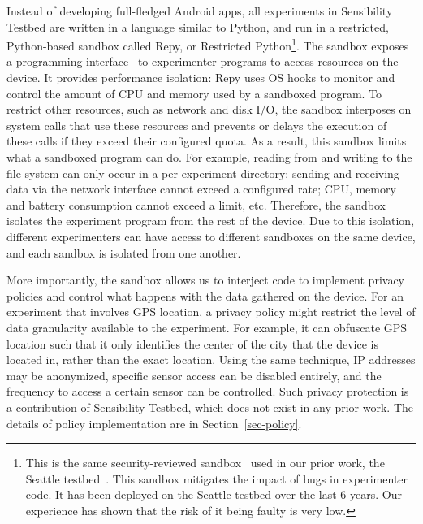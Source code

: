 Instead of developing full-fledged Android apps, all 
experiments in Sensibility Testbed are written in a language
similar to Python, and run in a restricted, Python-based
sandbox called Repy, or Restricted Python\footnote{This is the 
same security-reviewed sandbox~\cite{cappos2010retaining} used in
our prior work, the Seattle testbed~\cite{seattle}. This sandbox
mitigates the impact of bugs in experimenter code. It
has been deployed on the Seattle testbed over the last 6 years.
Our experience has shown that the risk of it being faulty is
very low.}. The sandbox exposes a programming 
interface~\cite{repyv2} to experimenter programs to access 
resources on the device. It provides performance isolation: 
Repy uses OS hooks to monitor and control the amount of 
CPU and memory used by a sandboxed program. To restrict 
other resources, such as network and disk I/O, the sandbox 
interposes on system calls that use these resources and 
prevents or delays the execution of these calls if they exceed 
their configured quota. As a result, this sandbox limits 
what a sandboxed program can do. For example, reading from and writing to the file system can
only occur in a per-experiment directory; sending and receiving
data via the network interface cannot exceed a configured rate;
CPU, memory and battery consumption cannot exceed a limit, etc.
Therefore, the sandbox isolates the experiment program from 
the rest of the device. Due to this isolation, different experimenters
can have access to different sandboxes on the same device,
and each sandbox is isolated from one another.

More importantly, the sandbox allows us to interject
code to implement privacy policies and control what happens with
the data gathered on the device. For  an experiment
that involves GPS location, a privacy policy might restrict the
level of data granularity available to the experiment. For example, it can
obfuscate GPS location such that it only identifies the center
of the city that the device is located in, rather than the exact
location. Using the same technique, IP addresses may be anonymized, 
specific sensor access can be disabled entirely, and the frequency to 
access a certain sensor can be controlled. Such privacy
protection is a contribution of Sensibility Testbed, which does
not exist in any prior work. The details of policy implementation 
are in Section~\ref{sec-policy}.

